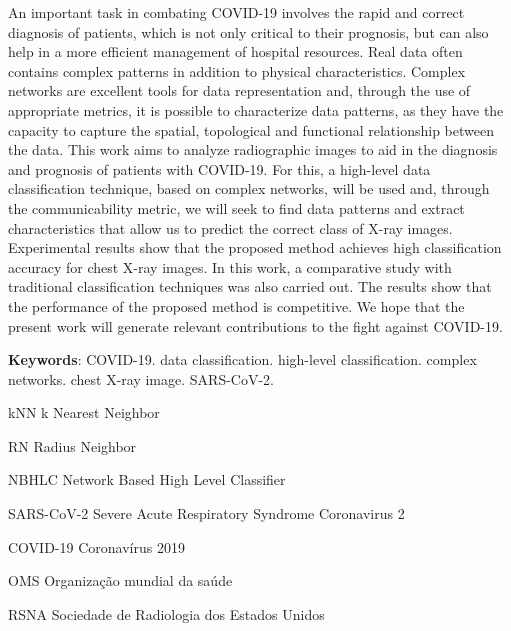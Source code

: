 \documentclass[
12pt,        %
oneside,     %
a4paper,     %
english,       %
brazil        %
%
%
]{ppgca}
\begin{document}
\begin{resumo}[Abstract]
   
An important task in combating COVID-19 involves the rapid and correct diagnosis of patients, which is not only critical to their prognosis, but can also help in a more efficient management of hospital resources. Real data often contains complex patterns in addition to physical characteristics. Complex networks are excellent tools for data representation and, through the use of appropriate metrics, it is possible to characterize data patterns, as they have the capacity to capture the spatial, topological and functional relationship between the data. This work aims to analyze radiographic images to aid in the diagnosis and prognosis of patients with COVID-19. For this, a high-level data classification technique, based on complex networks, will be used and, through the communicability metric, we will seek to find data patterns and extract characteristics that allow us to predict the correct class of X-ray images. Experimental results show that the proposed method achieves high classification accuracy for chest X-ray images. In this work, a comparative study with traditional classification techniques was also carried out. The results show that the performance of the proposed method is competitive. We hope that the present work will generate relevant contributions to the fight against COVID-19.

   \vspace{\onelineskip}

   \noindent \textbf{Keywords}: COVID-19. data classification. high-level classification. complex networks. chest X-ray image. SARS-CoV-2.
\end{resumo}


\listoffigures*
\cleardoublepage


\listoftables*
\cleardoublepage

\begin{siglas}
  \item[kNN] k Nearest Neighbor
  \item[RN] Radius Neighbor
  \item[NBHLC] Network Based High Level Classifier
  \item[SARS-CoV-2] Severe Acute Respiratory Syndrome Coronavirus 2
  \item[COVID-19] Coronavírus 2019
  \item[OMS] Organização mundial da saúde
  \item[RSNA] Sociedade de Radiologia dos Estados Unidos
\end{siglas}
\end{document}
